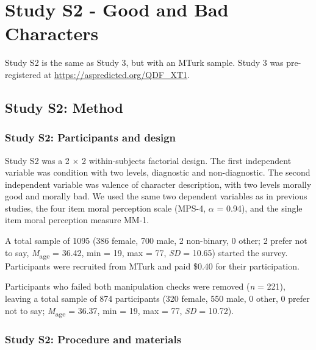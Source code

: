 \documentclass[
  man,floatsintext]{apa6}
\begin{document}
\newpage

\newpage

\pagebreak

\section{Study S2 - Good and Bad Characters}\label{study-s2---good-and-bad-characters}

Study S2 is the same as Study 3, but with an MTurk sample. Study 3 was pre-registered at \color{blue}\url{https://aspredicted.org/QDF_XT1}\color{black}.

\subsection{Study S2: Method}\label{study-s2-method}

\subsubsection{Study S2: Participants and design}\label{study-s2-participants-and-design}

Study S2 was a 2 \(\times\) 2 within-subjects factorial design. The first independent variable was condition with two levels, diagnostic and non-diagnostic. The second independent variable was valence of character description, with two levels morally good and morally bad. We used the same two dependent variables as in previous studies, the four item moral perception scale (MPS-4, \(\alpha\) = 0.94), and the single item moral perception measure MM-1.

A total sample of 1095 (386 female, 700 male, 2 non-binary, 0 other; 2 prefer not to say, \emph{M}\textsubscript{age} = 36.42, min = 19, max = 77, \emph{SD} = 10.65) started the survey. Participants were recruited from MTurk and paid \$0.40 for their participation.

Participants who failed both manipulation checks were removed (\emph{n} = 221), leaving a total sample of 874 participants (320 female, 550 male, 0 other, 0 prefer not to say; \emph{M}\textsubscript{age} = 36.37, min = 19, max = 77, \emph{SD} = 10.72).

\subsubsection{Study S2: Procedure and materials}\label{study-s2-procedure-and-materials}
\end{document}
